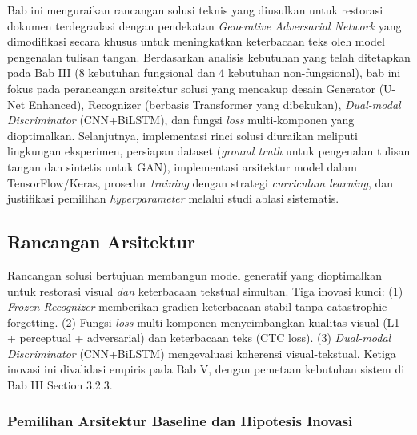 \documentclass[12pt,a4paper]{book}
\begin{document}

\renewcommand{\thesection}{\Roman{section}}
\renewcommand{\thesubsection}{\thesection.\arabic{subsection}}
\renewcommand{\thesubsubsection}{\thesubsection.\arabic{subsubsection}}

Bab ini menguraikan rancangan solusi teknis yang diusulkan untuk restorasi dokumen terdegradasi dengan pendekatan \textit{Generative Adversarial Network} yang dimodifikasi secara khusus untuk meningkatkan keterbacaan teks oleh model pengenalan tulisan tangan. Berdasarkan analisis kebutuhan yang telah ditetapkan pada Bab III (8 kebutuhan fungsional dan 4 kebutuhan non-fungsional), bab ini fokus pada perancangan arsitektur solusi yang mencakup desain Generator (U-Net Enhanced), Recognizer (berbasis Transformer yang dibekukan), \textit{Dual-modal Discriminator} (CNN+BiLSTM), dan fungsi \textit{loss} multi-komponen yang dioptimalkan. Selanjutnya, implementasi rinci solusi diuraikan meliputi lingkungan eksperimen, persiapan dataset (\textit{ground truth} untuk pengenalan tulisan tangan dan sintetis untuk GAN), implementasi arsitektur model dalam TensorFlow/Keras, prosedur \textit{training} dengan strategi \textit{curriculum learning}, dan justifikasi pemilihan \textit{hyperparameter} melalui studi ablasi sistematis.



\subsection{Rancangan Arsitektur} %

Rancangan solusi bertujuan membangun model generatif yang dioptimalkan untuk restorasi visual \textit{dan} keterbacaan tekstual simultan. Tiga inovasi kunci: (1) \textit{Frozen Recognizer} memberikan gradien keterbacaan stabil tanpa catastrophic forgetting. (2) Fungsi \textit{loss} multi-komponen menyeimbangkan kualitas visual (L1 + perceptual + adversarial) dan keterbacaan teks (CTC loss). (3) \textit{Dual-modal Discriminator} (CNN+BiLSTM) mengevaluasi koherensi visual-tekstual. Ketiga inovasi ini divalidasi empiris pada Bab V, dengan pemetaan kebutuhan sistem di Bab III Section 3.2.3.

\subsubsection{Pemilihan Arsitektur Baseline dan Hipotesis Inovasi} %
\label{subsubsec:justifikasi-arsitektur}
\end{document}
